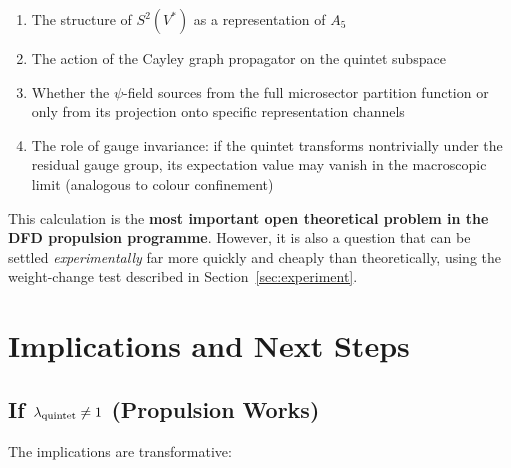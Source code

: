 \documentclass[12pt,a4paper]{article}
\theoremstyle{definition}
\theoremstyle{remark}
\begin{document}
\begin{enumerate}
\item The structure of $S^2(V^*)$ as a representation of $A_5$
\item The action of the Cayley graph propagator on the quintet subspace
\item Whether the $\psi$-field sources from the full microsector partition
function or only from its projection onto specific representation channels
\item The role of gauge invariance: if the quintet transforms nontrivially
under the residual gauge group, its expectation value may vanish in the
macroscopic limit (analogous to colour confinement)
\end{enumerate}

This calculation is the \textbf{most important open theoretical problem in the
DFD propulsion programme}.  However, it is also a question that can be settled
\emph{experimentally} far more quickly and cheaply than theoretically, using the
weight-change test described in Section~\ref{sec:experiment}.

\section{Implications and Next Steps}\label{sec:implications}

\subsection{If $\lambda_{\rm quintet} \neq 1$ (Propulsion Works)}

The implications are transformative:
\end{document}
